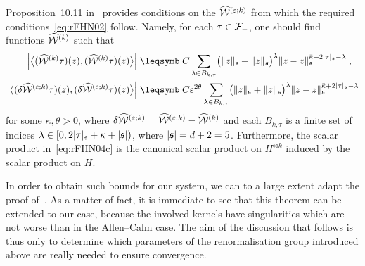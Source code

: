 \documentclass[reqno,11pt]{article}
\def\fraks{\mathfrak{s}}
\def\abss#1{\abs{#1}_\mathfrak{s}}
\begin{document}
%
Proposition~10.11 in~\cite{Hairer2014} provides conditions on the
$\widehat{{\mathcal W}}^{(\varepsilon;k)}$ from which the required conditions~\eqref{eq:rFHN02}
follow. Namely, for each $\tau\in{\mathcal F}_-$, one should find functions
$\widehat{{\mathcal W}}^{(k)}$ such that 
\begin{align}
\nonumber
\Bigabs{\bigpscal{(\widehat\cW^{(k)}\tau)(z)}{(\widehat\cW^{(k)}\tau)(\bar z)}}
&\leqs C \sum_{\lambda\in B_{k,\tau}} \bigpar{\norm{z}_{\fraks} +
\norm{\bar z}_{\fraks}}^\lambda \norm{z-\bar
z}_{\fraks}^{\bar\kappa+2\abss{\tau}-\lambda}\;, \\
\Bigabs{\bigpscal{(\delta\widehat\cW^{(\eps;k)}\tau)(z)}
{(\delta\widehat\cW^{(\eps;k)} \tau)(\bar z)}}
&\leqs C\eps^{2\theta} \sum_{\lambda\in B_{k,\tau}}
\bigpar{\norm{z}_{\fraks}
+ \norm{\bar z}_{\fraks}}^\lambda \norm{z-\bar
z}_{\fraks}^{\bar\kappa+2\abss{\tau}-\lambda}
\label{eq:rFHN04c}
\end{align}
for some $\bar\kappa,\theta>0$, where
$\delta\widehat{{\mathcal W}}^{(\varepsilon;k)}=\widehat{{\mathcal W}}^{(\varepsilon;k)}-\widehat{{\mathcal W}}^{(k)}$ and 
each $B_{k,\tau}$ is a finite set of indices
$\lambda\in[0,2\abss{\tau} +
\kappa + \abs{\fraks})$, where $\abs{\fraks}=d+2=5$. Furthermore, the scalar
product in~\eqref{eq:rFHN04c} is the canonical scalar product on $H^{\otimes
k}$ induced by the scalar product on $H$.

In order to obtain such bounds for our system, we can to a large extent
adapt the proof of~\cite[Thm.~10.22]{Hairer2014}. As a matter of fact, it is
immediate to see that this theorem can be extended to our case, because
the involved kernels have singularities which are not worse than in the
Allen--Cahn case. The aim of the discussion that follows is thus only to
determine which parameters of the renormalisation group introduced above are
really needed to ensure convergence. 
\end{document}
